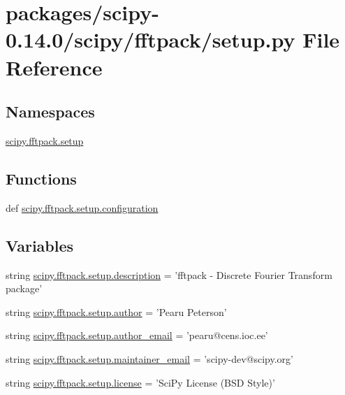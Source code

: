 \hypertarget{packages_2scipy-0_814_80_2scipy_2fftpack_2setup_8py}{}\section{packages/scipy-\/0.14.0/scipy/fftpack/setup.py File Reference}
\label{packages_2scipy-0_814_80_2scipy_2fftpack_2setup_8py}
\subsection*{Namespaces}
\begin{DoxyCompactItemize}
\item 
 \hyperlink{namespacescipy_1_1fftpack_1_1setup}{scipy.\+fftpack.\+setup}
\end{DoxyCompactItemize}
\subsection*{Functions}
\begin{DoxyCompactItemize}
\item 
def \hyperlink{namespacescipy_1_1fftpack_1_1setup_a3c71f9d899dbe54aa7376bd1c120f90f}{scipy.\+fftpack.\+setup.\+configuration}
\end{DoxyCompactItemize}
\subsection*{Variables}
\begin{DoxyCompactItemize}
\item 
string \hyperlink{namespacescipy_1_1fftpack_1_1setup_ade146845e0b460a463d0ebf5551fa990}{scipy.\+fftpack.\+setup.\+description} = 'fftpack -\/ Discrete Fourier Transform package'
\item 
string \hyperlink{namespacescipy_1_1fftpack_1_1setup_a0b760ad3f7bb68077a93eb14353a919a}{scipy.\+fftpack.\+setup.\+author} = 'Pearu Peterson'
\item 
string \hyperlink{namespacescipy_1_1fftpack_1_1setup_afdbdebfdeeb214f4a9eb896818850bf7}{scipy.\+fftpack.\+setup.\+author\+\_\+email} = 'pearu@cens.\+ioc.\+ee'
\item 
string \hyperlink{namespacescipy_1_1fftpack_1_1setup_aeee8004a47463846bb79573d80d17a99}{scipy.\+fftpack.\+setup.\+maintainer\+\_\+email} = 'scipy-\/dev@scipy.\+org'
\item 
string \hyperlink{namespacescipy_1_1fftpack_1_1setup_a2ee7131189db7b5db4602f1e18be96a2}{scipy.\+fftpack.\+setup.\+license} = 'Sci\+Py License (B\+S\+D Style)'
\end{DoxyCompactItemize}
